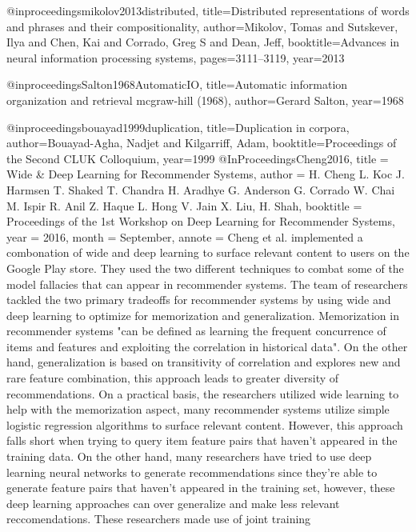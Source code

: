 @inproceedings{mikolov2013distributed,
  title={Distributed representations of words and phrases and their compositionality},
  author={Mikolov, Tomas and Sutskever, Ilya and Chen, Kai and Corrado, Greg S and Dean, Jeff},
  booktitle={Advances in neural information processing systems},
  pages={3111--3119},
  year={2013}
}

@inproceedings{Salton1968AutomaticIO,
  title={Automatic information organization and retrieval mcgraw-hill (1968)},
  author={Gerard Salton},
  year={1968}
}

@inproceedings{bouayad1999duplication,
  title={Duplication in corpora},
  author={Bouayad-Agha, Nadjet and Kilgarriff, Adam},
  booktitle={Proceedings of the Second CLUK Colloquium},
  year={1999}
}
@InProceedings{Cheng2016,
  title = {Wide \& Deep Learning for Recommender Systems},
  author = {H. Cheng L. Koc J. Harmsen T. Shaked T. Chandra H. Aradhye G. Anderson G. Corrado W. Chai M. Ispir R. Anil Z. Haque L. Hong V. Jain X. Liu, H. Shah},
  booktitle = {Proceedings of the 1st Workshop on Deep Learning for Recommender Systems},
  year = {2016},
  month = {September},
  annote = {Cheng et al. implemented a combonation of wide and deep learning to surface relevant content to 
  users on the Google Play store. They used the two different techniques to combat some of the model fallacies that
  can appear in recommender systems. The team of researchers tackled the two primary tradeoffs for recommender systems 
  by using wide and deep learning to optimize for memorization and generalization. Memorization in recommender
  systems "can be defined as learning the frequent concurrence of items and features and exploiting the correlation in historical
  data". On the other hand, generalization is based on transitivity of correlation and explores new and rare feature combination, this
  approach leads to greater diversity of recommendations. On a practical basis, the researchers utilized wide learning to help with the memorization
  aspect, many recommender systems utilize simple logistic regression algorithms to surface relevant content. However, this approach falls short when
  trying to query item feature pairs that haven't appeared in the training data. On the other hand, many researchers have tried to use
  deep learning neural networks to generate recommendations since they're able to generate feature pairs that haven't appeared in the training set,
  however, these deep learning approaches can over generalize and make less relevant reccomendations. These researchers made use of joint training
}}
